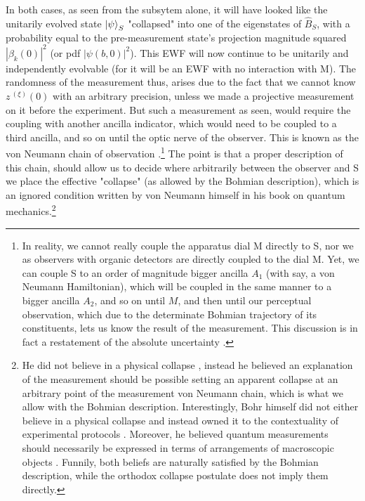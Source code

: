 \documentclass[11pt, a4paper]{article} %
\begin{document}
In both cases, as seen from the subsytem alone, it will have looked like the unitarily evolved state $\ket{\psi}_S$ "collapsed" into one of the eigenstates of $\hat{B}_S$, with a probability equal to the pre-measurement state's projection magnitude squared $|\beta_k(0)|^2$ (or pdf $|\psi(b,0)|^2$). This EWF will now continue to be unitarily and independently evolvable (for it will be an EWF with no interaction with M). The randomness of the measurement thus, arises due to the fact that we cannot know $z^{\:(\xi)}(0)$ with an arbitrary precision, unless we made a projective measurement on it before the experiment. But such a measurement as seen, would require the coupling with another ancilla indicator, which would need to be coupled to a third ancilla, and so on until the optic nerve of the observer. This is known as the von Neumann chain of observation \cite{vonNeumann}.\footnote{In reality, we cannot really couple the apparatus dial M directly to S, nor we as observers with organic detectors are directly coupled to the dial M. Yet, we can couple S to an order of magnitude bigger ancilla $A_1$ (with say, a von Neumann Hamiltonian), which will be coupled in the same manner to a bigger ancilla $A_2$, and so on until $M$, and then until our perceptual observation, which due to the determinate Bohmian trajectory of its constituents, lets us know the result of the measurement. This discussion is in fact a restatement of the absolute uncertainty \cite{Absolute}.} The point is that a proper description of this chain, should allow us to decide where arbitrarily between the observer and S we place the effective "collapse" (as allowed by the Bohmian description), which is an ignored condition written by von Neumann himself \cite{NeumannNoCollapse} in his book on quantum mechanics.\footnote{He did not believe in a physical collapse \cite{NeumannNoCollapse}, instead he believed an explanation of the measurement should be possible setting an apparent collapse at an arbitrary point of the measurement von Neumann chain, which is what we allow with the Bohmian description. Interestingly, Bohr himself did not either believe in a physical collapse and instead owned it to the contextuality of experimental protocols \cite{Dirac}. Moreover, he believed quantum measurements should necessarily be expressed in terms of arrangements of macroscopic objects \cite{Bohr}. Funnily, both beliefs are naturally satisfied by the Bohmian description, while the orthodox collapse postulate does not imply them directly.
}\vspace{-0.1cm}
\end{document}
